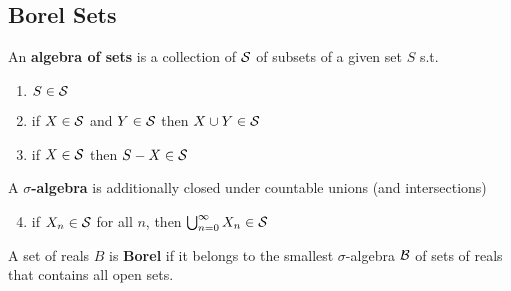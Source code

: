 \documentclass[11pt]{article}
\begin{document}
\subsection{Borel Sets}
\label{sec:org14e6af3}
\begin{definition}[]
An \textbf{algebra of sets} is a collection of \(\mathcal{S}\) of subsets of a given set \(S\)
s.t.
\begin{enumerate}
\item \(S\in\mathcal{S}\)
\item if \(X\in\mathcal{S}\) and \(Y\in\mathcal{S}\) then \(X\cup Y\in\mathcal{S}\)
\item if \(X\in\mathcal{S}\) then \(S-X\in\mathcal{S}\)
\end{enumerate}


A \textbf{\(\sigma\)-algebra} is additionally closed under countable unions (and
intersections)
\begin{enumerate}
\setcounter{enumi}{3}
\item if \(X_n\in\mathcal{S}\) for all \(n\), then \(\bigcup_{n=0}^\infty X_n\in\mathcal{S}\)
\end{enumerate}
\end{definition}

\begin{definition}[]
A set of reals \(B\) is \textbf{Borel} if it belongs to the smallest \(\sigma\)-algebra
\(\mathcal{B}\) of sets of reals that contains all open sets.
\end{definition}
\end{document}
